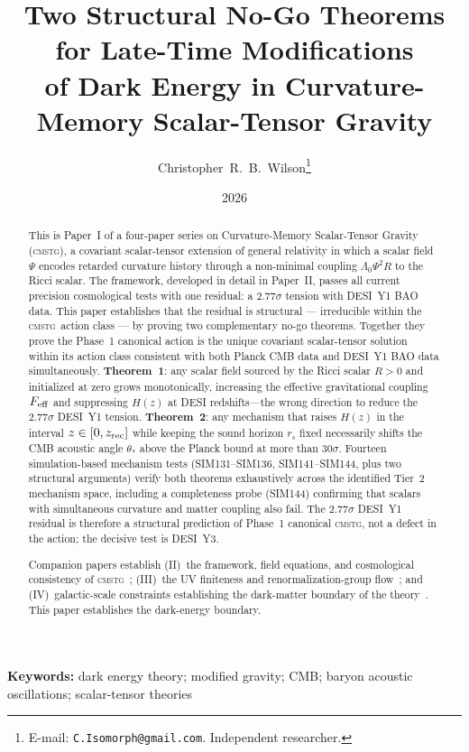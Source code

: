 \documentclass[12pt,a4paper]{article}
\title{\textbf{Two Structural No-Go Theorems for Late-Time Modifications\\
       of Dark Energy in Curvature-Memory Scalar-Tensor Gravity}}
\author{Christopher~R.~B.~Wilson\thanks{E-mail: \texttt{C.Isomorph@gmail.com}. Independent researcher.}}
\date{2026}
\newcommand{\CMSTG}{\textsc{cmstg}}
\newcommand{\Feff}{F_{\rm eff}}
\newcommand{\Lz}{\Lambda_0}
\newcommand{\thetastar}{\theta_*}
\newcommand{\rs}{r_s}
\theoremstyle{plain}
\begin{document}
\maketitle

\begin{abstract}
This is Paper~I of a four-paper series on Curvature-Memory Scalar-Tensor
Gravity (\CMSTG), a covariant scalar-tensor extension of general relativity
in which a scalar field $\Psi$ encodes retarded curvature history through a
non-minimal coupling $\Lz\Psi^2 R$ to the Ricci scalar. The framework,
developed in detail in Paper~II, passes all current precision cosmological
tests with one residual: a $2.77\sigma$ tension with DESI~Y1 BAO data.
This paper establishes that the residual is structural --- irreducible within
the \CMSTG\ action class --- by proving two complementary no-go theorems.
Together they prove the Phase~1 canonical action is the unique covariant
scalar-tensor solution within its action class consistent with both Planck
CMB data and DESI~Y1 BAO data simultaneously.
\textbf{Theorem~1}: any scalar field sourced by the Ricci scalar $R>0$
and initialized at zero grows monotonically, increasing the effective
gravitational coupling $\Feff$ and suppressing $H(z)$ at DESI
redshifts---the wrong direction to reduce the $2.77\sigma$ DESI~Y1
tension. \textbf{Theorem~2}: any mechanism that raises $H(z)$ in the
interval $z\in[0,z_{\rm rec}]$ while keeping the sound horizon $\rs$
fixed necessarily shifts the CMB acoustic angle $\thetastar$ above the
Planck bound at more than $30\sigma$. Fourteen simulation-based mechanism
tests (SIM131--SIM136, SIM141--SIM144, plus two structural arguments)
verify both theorems exhaustively across the identified Tier~2 mechanism
space, including a completeness probe (SIM144) confirming that scalars
with simultaneous curvature and matter coupling also fail.
The $2.77\sigma$ DESI~Y1 residual is therefore a structural
prediction of Phase~1 canonical \CMSTG, not a defect in the action; the
decisive test is DESI~Y3.

Companion papers establish (II)~the framework, field equations, and
cosmological consistency of \CMSTG~\cite{WilsonPaperII}; (III)~the UV
finiteness and renormalization-group flow~\cite{WilsonPaperIII}; and
(IV)~galactic-scale constraints establishing the dark-matter boundary of
the theory~\cite{WilsonPaperIV}. This paper establishes the dark-energy
boundary.
\end{abstract}

\noindent\textbf{Keywords:} dark energy theory; modified gravity; CMB; baryon acoustic oscillations; scalar-tensor theories
\end{document}
